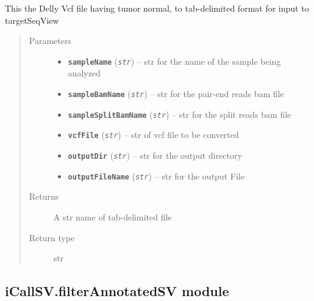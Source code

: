 \documentclass[letterpaper,10pt,english]{sphinxmanual}
\begin{document}
\begin{fulllineitems}
\label{iCallSV:iCallSV.dellyVcf2targetSeqView.Convert2targetSeqView}
This  the Delly Vcf file having tumor normal, to tab-delimited format for input to targetSeqView
\begin{quote}\begin{description}
\item[{Parameters}] \leavevmode\begin{itemize}
\item {} 
\textbf{\texttt{sampleName}} (\emph{\texttt{str}}) -- str for the name of the sample being analyzed

\item {} 
\textbf{\texttt{sampleBamName}} (\emph{\texttt{str}}) -- str for the pair-end reads bam file

\item {} 
\textbf{\texttt{sampleSplitBamName}} (\emph{\texttt{str}}) -- str for the split reads bam file

\item {} 
\textbf{\texttt{vcfFile}} (\emph{\texttt{str}}) -- str of vcf file to be converted

\item {} 
\textbf{\texttt{outputDir}} (\emph{\texttt{str}}) -- str for the output directory

\item {} 
\textbf{\texttt{outputFileName}} (\emph{\texttt{str}}) -- str for the output File

\end{itemize}

\item[{Returns}] \leavevmode
A str name of tab-delimited file

\item[{Return type}] \leavevmode
str

\end{description}\end{quote}

\end{fulllineitems}



\subsection{iCallSV.filterAnnotatedSV module}
\label{iCallSV:icallsv-filterannotatedsv-module}\label{iCallSV:module-iCallSV.filterAnnotatedSV}
\end{document}
